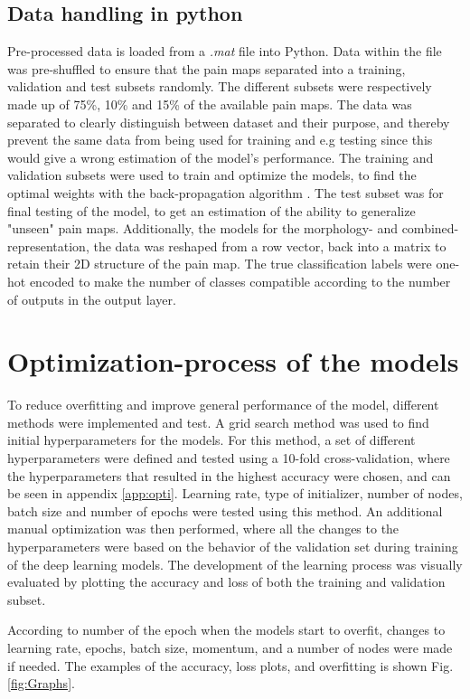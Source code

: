 \subsection{Data handling in python}
Pre-processed data is loaded from a \textit{.mat} file into Python.
Data within the file was pre-shuffled to ensure that the pain maps separated into a training, validation and test subsets randomly. The different subsets were respectively made up of 75\%, 10\% and 15\% of the available pain maps. The data was separated to clearly distinguish between dataset and their purpose, and thereby prevent the same data from being used for training and e.g testing since this would give a wrong estimation of the model’s performance.
The training and validation subsets were used to train and optimize the models, to find the optimal weights with the back-propagation algorithm \citep{Bengio2012}.
The test subset was for final testing of the model, to get an estimation of the ability to generalize "unseen" pain maps.
Additionally, the models for the morphology- and combined-representation, the data was reshaped from a row vector, back into a matrix to retain their 2D structure of the pain map.
The true classification labels were one-hot encoded to make the number of classes compatible according to the number of outputs in the output layer.

\section{Optimization-process of the models}
To reduce overfitting and improve general performance of the model, different methods were implemented and test.
A grid search method was used to find initial hyperparameters for the models. For this method, a set of different hyperparameters were defined and tested using a 10-fold cross-validation, where the hyperparameters that resulted in the highest accuracy were chosen, and can be seen in appendix \ref{app:opti}. Learning rate, type of initializer, number of nodes, batch size and number of epochs were tested using this method. 
An additional manual optimization was then performed, where all the changes to the hyperparameters were based on the behavior of the validation set during training of the deep learning models.
The development of the learning process was visually evaluated by plotting the accuracy and loss of both the training and validation subset. 



According to number of the epoch when the models start to overfit, changes to learning rate, epochs, batch size, momentum, and a number of nodes were made if needed. The examples of the accuracy, loss plots, and overfitting is shown Fig. \ref{fig:Graphs}.

